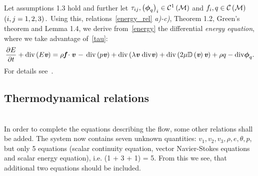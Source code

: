 \paragraph{}
Let assumptions 1.3 hold and further let $\tau_{ij},\left({}\boldsymbol{\phi}_q\right)_i \in \mathcal{C}^1\left({}\mathcal{M}\right) $ and $f_i,q\in\mathcal{C}\left({}\mathcal{M}\right) $ $\left({}i,j=1,2 , 3\right).$ Using this, relations~\eqref{energy_rel} \textit{a)-c)}, Theorem 1.2, Green's theorem and Lemma 1.4, we derive from~\eqref{energy} the differential \textit{energy equation}, where we take advantage of~\eqref{tau}:
\begin{equation}\label{energy_fin}
 \pds{E}{t} + \mathrm{div}\lo{E}\bs{v}\ro = \rho\bs{f}\cdot\bs{v} \,-\,\mathrm{div}\lo{p}\bs{v}\ro + \mathrm{div}\lo{}\lambda\bs{v}\ \mathrm{div}\bs{v}\ro + \mathrm{div}\lo{2}\mu\mathbb{D}\lo{}\bs{v}\ro\bs{v}\ro +
\rho{q}- \mathrm{div}\bsm{\phi}_q.
\end{equation}
For details see~\cite{compress}.
\subsection{Thermodynamical relations}
\ \\In order to complete the equations describing the flow, some other relations shall be added.
The system now contains seven unknown quantities: $v_1,v_2,v_3, \rho, e, \theta, p$, but only 5 equations (scalar continuity equation, vector Navier-Stokes equations and scalar energy equation), i.e. (1 + 3 + 1) = 5. From this we see, that additional two equations should be included.
